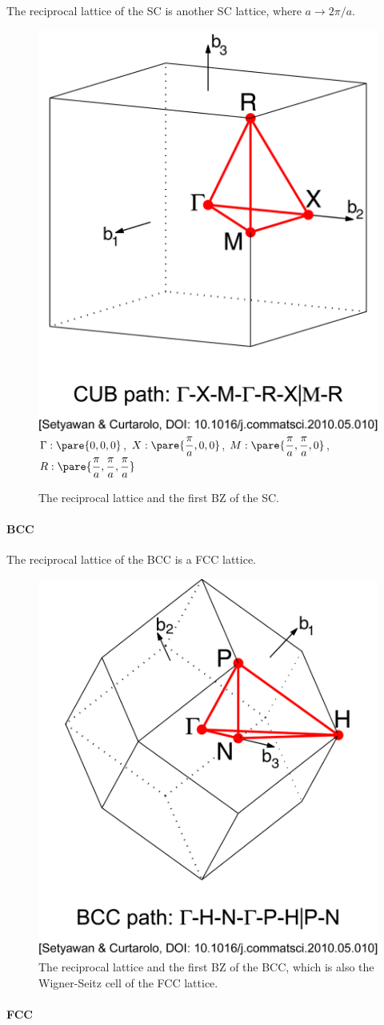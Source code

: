 \documentclass[hidelinks]{ctexart}
\begin{document}
The reciprocal lattice of the SC is another SC lattice, where $a\rightarrow 2\pi/a$.
\begin{figure}[ht]
    \centering
    \includegraphics[width=.3\textwidth]{src/SCBZ.png}\\
    $\Gamma: \pare{0,0,0}$, $\displaystyle X:\pare{\frac{\pi}{a},0,0}$, $\displaystyle  M: \pare{\frac{\pi}{a},\frac{\pi}{a},0}$, $\displaystyle R: \pare{\frac{\pi}{a},\frac{\pi}{a},\frac{\pi}{a}}$
    \caption{The reciprocal lattice and the first BZ of the SC.}
\end{figure}


\paragraph{BCC} %
\label{par:bcc}

The reciprocal lattice of the BCC is a FCC lattice.
\begin{figure}[ht]
    \centering
    \includegraphics[width=.3\textwidth]{src/BCCBZ.png}
    \caption{The reciprocal lattice and the first BZ of the BCC, which is also the Wigner-Seitz cell of the FCC lattice.}
\end{figure}


\paragraph{FCC} %
\label{par:fcc}
\end{document}
